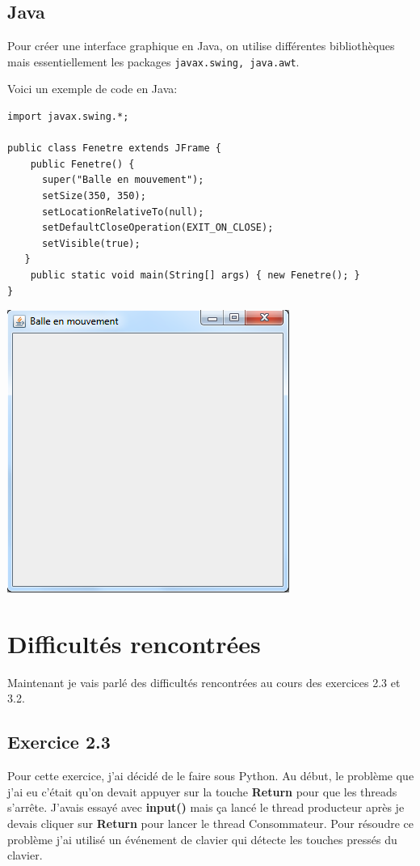 \documentclass{article}
\begin{document}
\subsection{Java}

Pour créer une interface graphique en Java, on utilise différentes bibliothèques mais essentiellement les packages \verb|javax.swing, java.awt|.

\bigskip Voici un exemple de code en Java:
\begin{verbatim} 
import javax.swing.*;

public class Fenetre extends JFrame {
	public Fenetre() {
      super("Balle en mouvement");
      setSize(350, 350);
      setLocationRelativeTo(null);
      setDefaultCloseOperation(EXIT_ON_CLOSE);
      setVisible(true);
   }
	public static void main(String[] args) { new Fenetre(); }	
}

 \end{verbatim} 
\begin{center}\includegraphics[scale=0.5]{Images/fenetreJava.png}\end{center}

\section{Difficultés rencontrées}
Maintenant je vais parlé des difficultés rencontrées au cours des exercices 2.3 et 3.2.
\subsection{Exercice 2.3}
Pour cette exercice, j'ai décidé de le faire sous Python. Au début, le problème que j'ai eu c'était qu'on devait appuyer sur la touche \textbf{Return} pour que les threads s'arrête.
J'avais essayé avec \textbf{input()} mais ça lancé le thread producteur après je devais cliquer sur \textbf{Return} pour lancer le thread Consommateur.
Pour résoudre ce problème j'ai utilisé un événement de clavier qui détecte les touches pressés du clavier.
\end{document}
